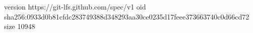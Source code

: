 version https://git-lfs.github.com/spec/v1
oid sha256:0933d0b81cfdc283749388d348293aa30ce0235d17feee373663740c0d66cd72
size 10948

